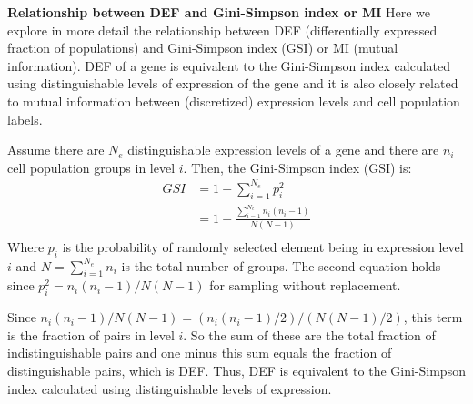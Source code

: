 \textbf{Relationship between DEF and Gini-Simpson index or MI} 
Here we explore in more detail the relationship between DEF (differentially expressed fraction of populations) and Gini-Simpson index (GSI) or MI (mutual information). DEF of a gene is equivalent to the Gini-Simpson index calculated using distinguishable levels of expression of the gene and it is also closely related to mutual information between (discretized) expression levels and cell population labels. 

Assume there are $N_e$ distinguishable expression levels of a gene and there are $n_i$ cell population groups in level $i$. Then, the Gini-Simpson index (GSI) is:
\begin{align}
GSI &= 1 - \sum_{i=1}^{N_e}{p_{i}^2} \\
    &= 1 - \frac{\sum_{i=1}^{N_e}{n_i(n_i-1)}}{N(N-1)} \\
\end{align}
Where $p_{i}$ is the probability of randomly selected element being in expression level $i$ and $N=\sum_{i=1}^{N_e}{n_i}$ is the total number of groups. The second equation holds since $p_{i}^2=n_i(n_i-1)/N(N-1)$ for sampling without replacement. 

Since $n_i(n_i-1)/N(N-1)=(n_i(n_i-1)/2)/(N(N-1)/2)$, this term is the fraction of pairs in level $i$. So the sum of these are the total fraction of indistinguishable pairs and one minus this sum equals the fraction of distinguishable pairs, which is DEF. Thus, DEF is equivalent to the Gini-Simpson index calculated using distinguishable levels of expression.

